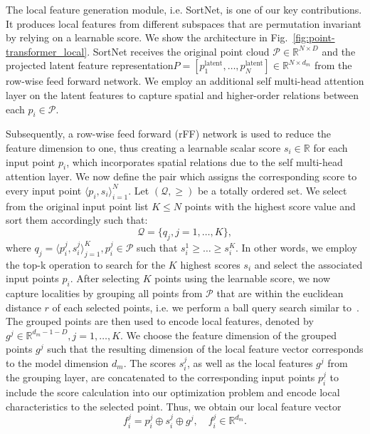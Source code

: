 \documentclass{ieeeaccess}
\begin{document}
The local feature generation module, i.e. SortNet, is one of our key contributions. It produces local features from different subspaces that are permutation invariant by relying on a learnable score.
We show the architecture in Fig.~\ref{fig:point-transformer_local}. SortNet receives the original point cloud \mbox{$\mathcal{P} \in \mathbb{R}^{N \times D}$} and the projected latent feature representation\mbox{$P = [p_1^{\text{latent}}, \dots, p_N^{\text{latent}}] \in \mathbb{R}^{N\times d_m}$} from the row-wise feed forward network. We employ an additional self multi-head attention layer on the latent features to capture spatial and higher-order relations between each $p_i \in \mathcal{P}$.

Subsequently, a row-wise feed forward (rFF) network is used to reduce the feature dimension to one, thus creating a learnable scalar score $s_i \in \mathbb{R}$ for each input point $p_i$, which incorporates spatial relations due to the self multi-head attention layer. We now define the pair which assigns the corresponding score to every input point $\langle p_i, s_i \rangle_{i=1}^{N}$. Let $(\mathcal{Q}, \geq)$ be a totally ordered set. We select from the original input point list $K \leq N$ points with the highest score value and sort them accordingly such that:
\begin{equation}
\mathcal{Q} = \{q_j, j = 1, \dots, K\},  
\end{equation}
where $q_j = \langle p_{i}^j, s_{i}^j \rangle_{j=1}^K, p_{i}^j \in \mathcal{P}$ such that $s_{i}^1 \geq \dotsc \geq s_{i}^K$.  In other words, we employ the top-k operation to search for the $K$ highest scores $s_i$ and select the associated input points $p_i$.
After selecting $K$ points using the learnable score, we now capture localities by grouping all points from $\mathcal{P}$ that are within the euclidean distance $r$ of each selected points, i.e. we perform a ball query search similar to~\cite{qi2017pointnet++}. The grouped points are then used to encode local features, denoted by $g^j \in \mathbb{R}^{d_m - 1 - D}, j = 1, \dots, K$. We choose the feature dimension of the grouped points $g^j$ such that the resulting dimension of the local feature vector corresponds to the model dimension $d_{m}$.
The scores $s_{i}^j$, as well as the local features $g^j$ from the grouping layer, are concatenated to the corresponding input points $p_{i}^j$ to include the score calculation into our optimization problem and encode local characteristics to the selected point. Thus, we obtain our local feature vector 
\begin{equation}
    f_{i}^j = p_{i}^j \oplus s_{i}^j \oplus g^j , \quad f_{i}^j \in \mathbb{R}^{d_{m}}.
\end{equation}
\end{document}

